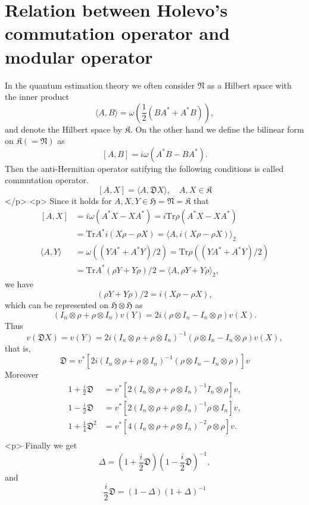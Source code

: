 \section{Relation between Holevo's commutation operator and modular operator}

In the quantum estimation theory we often consider $\mathfrak{N}$
as a Hilbert space with the inner product
	$$
	\langle A,B \rangle = \omega(\frac{1}{2}(BA^{\ast}+A^{\ast}B)),
	$$
	and denote the Hilbert space by $\mathfrak{K}$.
On the other hand we define 
the bilinear form on
$\mathfrak{K}(=\mathfrak{N})$ as
$$
[A,B]=i\omega(A^{\ast}B-BA^{\ast}).
$$
Then	the anti-Hermitian operator satifying the following conditions is called  commutation operator.
$$
[A,X]=\langle A, \mathfrak{D}X\rangle, \quad A,X\in \mathfrak{K}
$$
</p>
<p>
Since it holds for $A,X,Y\in \mathfrak{H}=\mathfrak{N}=\mathfrak{K}$
that 
 $$
 \begin{split}
 [A,X]&=i\omega(A^\ast X-XA^\ast)=i\mbox{Tr}\rho(A^\ast X-XA^\ast)\\
      &=\mbox{Tr}A^\ast i(X\rho-\rho X)=\langle A, i(X\rho-\rho X)\rangle_2\\
 \langle A,Y\rangle&=\omega((YA^\ast+A^\ast Y)/2)=\mbox{Tr}\rho((YA^\ast+A^\ast Y)/2)\\
 &=\mbox{Tr}A^\ast(\rho Y+Y\rho)/2=\langle A, \rho Y+Y\rho \rangle_2,
 \end{split}
 $$
  we have
 $$
 (\rho Y+Y\rho)/2=i(X\rho-\rho X),
 $$
 which can be represented on $\mathfrak{H}\otimes \mathfrak{H}$ as
	$$
	(I_n\otimes \rho + \rho\otimes I_n)v(Y)=2i(\rho\otimes I_n -I_n\otimes \rho )v(X).
	$$
	Thus 
	$$
	v(\mathfrak{D}X)=v(Y)=2i(I_n\otimes \rho + \rho\otimes I_n)^{-1}(\rho\otimes I_n -I_n\otimes \rho )v(X),

	$$
	that is,
	$$
	\mathfrak{D}=v^\ast[ 2i(I_n\otimes \rho + \rho\otimes I_n)^{-1}(\rho\otimes I_n -I_n\otimes \rho )]v
	$$
	  Moreover
		$$
		\begin{split}
    1+\frac{i}{2}\mathfrak{D}&=v^\ast [ 2(I_n\otimes \rho+\rho\otimes I_n)^{-1}  I_n\otimes \rho]v,\\
    1-\frac{i}{2}\mathfrak{D}&=v^\ast [ 2(I_n\otimes \rho+\rho\otimes I_n)^{-1}\rho \otimes I_n]v,\\
    1+\frac{1}{4}\mathfrak{D}^2&=v^\ast[ 4(I_n\otimes \rho+\rho\otimes I_n)^{-2}\rho \otimes \rho]v.\\

    \end{split}
		$$
	<p>
	Finally	we get
		$$
    \Delta=\left(1+\frac{i}{2}\mathfrak{D}\right)\left(1-\frac{i}{2}\mathfrak{D}\right)^{-1},
		$$
		and
		$$
     \frac{i}{2}\mathfrak{D}=(1-\Delta)(1+\Delta)^{-1}
		$$

